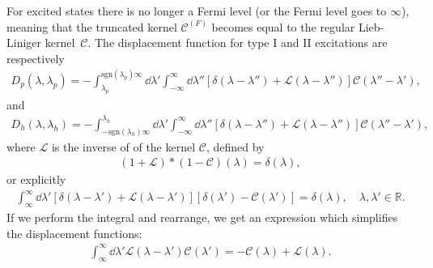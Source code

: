 \documentclass[11pt, a4paper,draft]{report} %
\newcommand{\inversetruncc}{\mathcal{L}}
\newcommand{\kernel}{\mathcal{C}}
\begin{document}
For excited states there is no longer a Fermi level \cite{tofind} (or the Fermi level goes to \(\infty\)), meaning that the truncated kernel \(\kernel^{(F)}\) becomes equal to the regular Lieb-Liniger kernel~\(\kernel\).
The displacement function for type I and II excitations are respectively \cite{tofind}
\begin{align}
	D_p(\lambda, \lambda_p) = - \int_{\lambda_p}^{\textrm{sgn}(\lambda_p)\infty} \dd \lambda' \int_{-\infty}^{\infty} \dd  \lambda'' \left[\delta(\lambda-\lambda'') + \inversetruncc(\lambda-\lambda'') \right]\kernel(\lambda''-\lambda'),
\end{align}
and
\begin{align}
	D_h(\lambda, \lambda_h) = - \int_{-\textrm{sgn}(\lambda_h)\infty}^{\lambda_h} \dd \lambda' \int_{-\infty}^{\infty} \dd \lambda'' \left[\delta(\lambda-\lambda'') + \inversetruncc(\lambda - \lambda'') \right]\kernel(\lambda''-\lambda'),
\end{align}
where \(\inversetruncc\) is the inverse of of the kernel \(\kernel\), defined by \cite{tofind}
\begin{align}
	(1+\inversetruncc)*(1-\kernel)(\lambda) = \delta(\lambda),
\end{align}
or explicitly
\begin{align}
	\int_{\infty}^{\infty} \dd \lambda' \left[ \delta(\lambda-\lambda') + \inversetruncc(\lambda-\lambda') \right] \left[ \delta(\lambda') - \kernel(\lambda')\right] = \delta(\lambda), \quad \lambda, \lambda' \in \mathbb{R}.
\end{align}
If we perform the integral and rearrange, we get an expression which simplifies the displacement functions:
\begin{align}\label{eq:kernelinversion}
	\int_{\infty}^{\infty} \dd \lambda' \inversetruncc(\lambda-\lambda') \kernel(\lambda') = -\kernel(\lambda) + \inversetruncc(\lambda).
\end{align}
\end{document}
